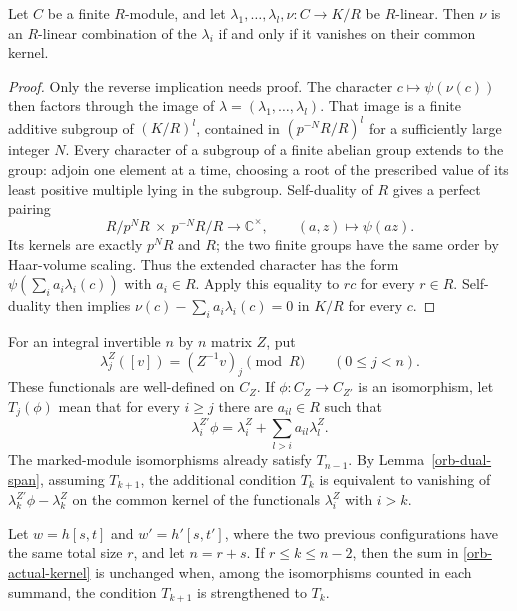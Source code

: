 \begin{lemma}\label{orb-dual-span}
Let $C$ be a finite $R$-module, and let
$\lambda_1,\ldots,\lambda_l,\nu:C\to K/R$ be $R$-linear.
Then $\nu$ is an $R$-linear combination of the $\lambda_i$
if and only if it vanishes on their common kernel.
\end{lemma}

\begin{proof}
Only the reverse implication needs proof.  The character
$c\mapsto\psi(\nu(c))$ then factors through the image of
$\lambda=(\lambda_1,\ldots,\lambda_l)$.
That image is a finite additive subgroup of $(K/R)^l$, contained
in $(p^{-N}R/R)^l$ for a sufficiently large integer $N$.
Every character of a subgroup of a finite abelian group extends
to the group: adjoin one element at a time, choosing a root of
the prescribed value of its least positive multiple lying in
the subgroup.  Self-duality of $R$ gives a perfect pairing
\[
 R/p^NR\ \times\ p^{-N}R/R\longrightarrow\mathbb C^\times,
 \qquad(a,z)\longmapsto\psi(az).
\]
Its kernels are exactly $p^NR$ and $R$; the two finite groups
have the same order by Haar-volume scaling.  Thus the extended
character has the form
$\psi(\sum_i a_i\lambda_i(c))$ with $a_i\in R$.
Apply this equality to $rc$ for every $r\in R$.  Self-duality
then implies
$\nu(c)-\sum_i a_i\lambda_i(c)=0$ in $K/R$ for every $c$.
\end{proof}

For an integral invertible $n$ by $n$ matrix $Z$, put
\[
 \lambda_j^Z([v])=(Z^{-1}v)_j\pmod R
 \qquad(0\le j<n).
\]
These functionals are well-defined on $C_Z$.  If
$\phi:C_Z\to C_{Z'}$ is an isomorphism, let $T_j(\phi)$
mean that for every $i\ge j$ there are $a_{il}\in R$ such that
\begin{equation}\label{orb-triangular}
 \lambda_i^{Z'}\phi=\lambda_i^Z+
                                  \sum_{l>i}a_{il}\lambda_l^Z.
\end{equation}
The marked-module isomorphisms already satisfy $T_{n-1}$.
By Lemma~\ref{orb-dual-span}, assuming $T_{k+1}$, the additional
condition $T_k$ is equivalent to vanishing of
$\lambda_k^{Z'}\phi-\lambda_k^Z$ on the common kernel of the
functionals $\lambda_i^Z$ with $i>k$.

\begin{proposition}\label{orb-triangular-average}
Let $w=h[s,t]$ and $w'=h'[s,t']$, where the two previous
configurations have the same total size $r$, and let
$n=r+s$.  If $r\le k\le n-2$, then the sum in
\eqref{orb-actual-kernel} is unchanged when, among the
isomorphisms counted in each summand, the condition $T_{k+1}$
is strengthened to $T_k$.
\end{proposition}

